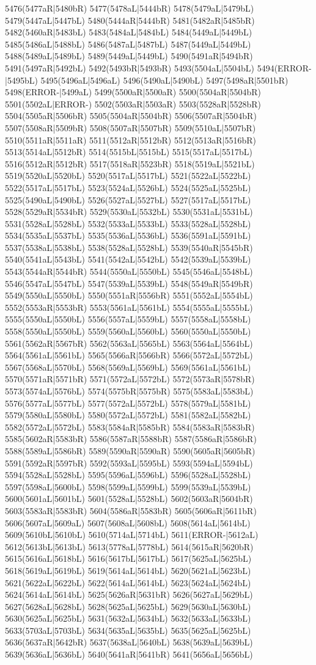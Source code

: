 5476(5477aR|5480bR) 5477(5478aL|5444bR) 5478(5479aL|5479bL) 5479(5447aL|5447bL) 5480(5444aR|5444bR) 5481(5482aR|5485bR) 5482(5460aR|5483bL) 5483(5484aL|5484bL) 5484(5449aL|5449bL) 5485(5486aL|5488bL) 5486(5487aL|5487bL) 5487(5449aL|5449bL) 5488(5489aL|5489bL) 5489(5449aL|5449bL) 5490(5491aR|5494bR) 5491(5497aR|5492bL) 5492(5493bR|5493bR) 5493(5504aL|5504bL) 5494(ERROR-|5495bL) 5495(5496aL|5496aL) 5496(5490aL|5490bL) 5497(5498aR|5501bR) 5498(ERROR-|5499aL) 5499(5500aR|5500aR) 5500(5504aR|5504bR) 5501(5502aL|ERROR-) 5502(5503aR|5503aR) 5503(5528aR|5528bR) 5504(5505aR|5506bR) 5505(5504aR|5504bR) 5506(5507aR|5504bR) 5507(5508aR|5509bR) 5508(5507aR|5507bR) 5509(5510aL|5507bR) 5510(5511aR|5511aR) 5511(5512aR|5512bR) 5512(5513aR|5516bR) 5513(5514aL|5512bR) 5514(5515bL|5515bL) 5515(5517aL|5517bL) 5516(5512aR|5512bR) 5517(5518aR|5523bR) 5518(5519aL|5521bL) 5519(5520aL|5520bL) 5520(5517aL|5517bL) 5521(5522aL|5522bL) 5522(5517aL|5517bL) 5523(5524aL|5526bL) 5524(5525aL|5525bL) 5525(5490aL|5490bL) 5526(5527aL|5527bL) 5527(5517aL|5517bL) 5528(5529aR|5534bR) 5529(5530aL|5532bL) 5530(5531aL|5531bL) 5531(5528aL|5528bL) 5532(5533aL|5533bL) 5533(5528aL|5528bL) 5534(5535aL|5537bL) 5535(5536aL|5536bL) 5536(5591aL|5591bL) 5537(5538aL|5538bL) 5538(5528aL|5528bL) 5539(5540aR|5545bR) 5540(5541aL|5543bL) 5541(5542aL|5542bL) 5542(5539aL|5539bL) 5543(5544aR|5544bR) 5544(5550aL|5550bL) 5545(5546aL|5548bL) 5546(5547aL|5547bL) 5547(5539aL|5539bL) 5548(5549aR|5549bR) 5549(5550aL|5550bL) 5550(5551aR|5556bR) 5551(5552aL|5554bL) 5552(5553aR|5553bR) 5553(5561aL|5561bL) 5554(5555aL|5555bL) 5555(5550aL|5550bL) 5556(5557aL|5559bL) 5557(5558aL|5558bL) 5558(5550aL|5550bL) 5559(5560aL|5560bL) 5560(5550aL|5550bL) 5561(5562aR|5567bR) 5562(5563aL|5565bL) 5563(5564aL|5564bL) 5564(5561aL|5561bL) 5565(5566aR|5566bR) 5566(5572aL|5572bL) 5567(5568aL|5570bL) 5568(5569aL|5569bL) 5569(5561aL|5561bL) 5570(5571aR|5571bR) 5571(5572aL|5572bL) 5572(5573aR|5578bR) 5573(5574aL|5576bL) 5574(5575bR|5575bR) 5575(5583aL|5583bL) 5576(5577aL|5577bL) 5577(5572aL|5572bL) 5578(5579aL|5581bL) 5579(5580aL|5580bL) 5580(5572aL|5572bL) 5581(5582aL|5582bL) 5582(5572aL|5572bL) 5583(5584aR|5585bR) 5584(5583aR|5583bR) 5585(5602aR|5583bR) 5586(5587aR|5588bR) 5587(5586aR|5586bR) 5588(5589aL|5586bR) 5589(5590aR|5590aR) 5590(5605aR|5605bR) 5591(5592aR|5597bR) 5592(5593aL|5595bL) 5593(5594aL|5594bL) 5594(5528aL|5528bL) 5595(5596aL|5596bL) 5596(5528aL|5528bL) 5597(5598aL|5600bL) 5598(5599aL|5599bL) 5599(5539aL|5539bL) 5600(5601aL|5601bL) 5601(5528aL|5528bL) 5602(5603aR|5604bR) 5603(5583aR|5583bR) 5604(5586aR|5583bR) 5605(5606aR|5611bR) 5606(5607aL|5609aL) 5607(5608aL|5608bL) 5608(5614aL|5614bL) 5609(5610bL|5610bL) 5610(5714aL|5714bL) 5611(ERROR-|5612aL) 5612(5613bL|5613bL) 5613(5778aL|5778bL) 5614(5615aR|5620bR) 5615(5616aL|5618bL) 5616(5617bL|5617bL) 5617(5625aL|5625bL) 5618(5619aL|5619bL) 5619(5614aL|5614bL) 5620(5621aL|5623bL) 5621(5622aL|5622bL) 5622(5614aL|5614bL) 5623(5624aL|5624bL) 5624(5614aL|5614bL) 5625(5626aR|5631bR) 5626(5627aL|5629bL) 5627(5628aL|5628bL) 5628(5625aL|5625bL) 5629(5630aL|5630bL) 5630(5625aL|5625bL) 5631(5632aL|5634bL) 5632(5633aL|5633bL) 5633(5703aL|5703bL) 5634(5635aL|5635bL) 5635(5625aL|5625bL) 5636(5637aR|5642bR) 5637(5638aL|5640bL) 5638(5639aL|5639bL) 5639(5636aL|5636bL) 5640(5641aR|5641bR) 5641(5656aL|5656bL) 
